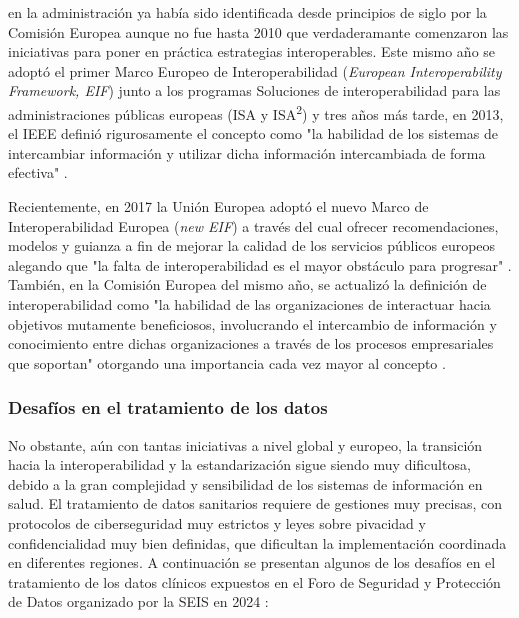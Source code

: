 \begin{enumerate}[label=\alph*.]
    en la administración ya había sido identificada desde principios de siglo por la Comisión Europea \cite{CEU1999ida} aunque no fue hasta 2010 que verdaderamante comenzaron las iniciativas para poner en práctica estrategias interoperables. Este mismo año se adoptó el primer Marco Europeo de Interoperabilidad (\textit{European Interoperability Framework, EIF}) junto a los programas Soluciones de interoperabilidad para las administraciones públicas europeas (ISA y ISA\textsuperscript{2}) y tres años más tarde, en 2013,  el IEEE definió rigurosamente el concepto como "la habilidad de los sistemas de intercambiar información y utilizar dicha información intercambiada de forma efectiva" \cite{berryman2013data}. 
    
    Recientemente, en 2017 la Unión Europea adoptó el nuevo Marco de Interoperabilidad Europea (\textit{new EIF})  a través del cual ofrecer recomendaciones, modelos y guianza a fin de mejorar la calidad de los servicios públicos europeos alegando que "la falta de interoperabilidad es el mayor obstáculo para progresar" \cite{kouroubali2019new}. También, en la Comisión Europea del mismo año, se actualizó la definición de interoperabilidad como "la habilidad de las organizaciones de interactuar hacia objetivos mutamente beneficiosos, involucrando el intercambio de información y conocimiento entre dichas organizaciones a través de los procesos empresariales que soportan" otorgando una importancia cada vez mayor al concepto \cite{katehakis2019framework}\cite{CEU2017eif} \cite{casiano2022towards}. 

\end{enumerate}

\subsubsection{Desafíos en el tratamiento de los datos}

No obstante, aún con tantas iniciativas a nivel global y europeo, la transición hacia la interoperabilidad y la estandarización sigue siendo muy dificultosa, debido a la gran complejidad y sensibilidad de los sistemas de información en salud. El tratamiento de datos sanitarios requiere de gestiones muy precisas, con protocolos de ciberseguridad muy estrictos y leyes sobre pivacidad y confidencialidad muy bien definidas, que dificultan la implementación coordinada en diferentes regiones. A continuación se presentan algunos de los desafíos en el tratamiento de los datos clínicos expuestos en el Foro de Seguridad y Protección de Datos organizado por la SEIS en 2024 \cite{SEIS2024tercera} \cite{SEIS2024octava}:

